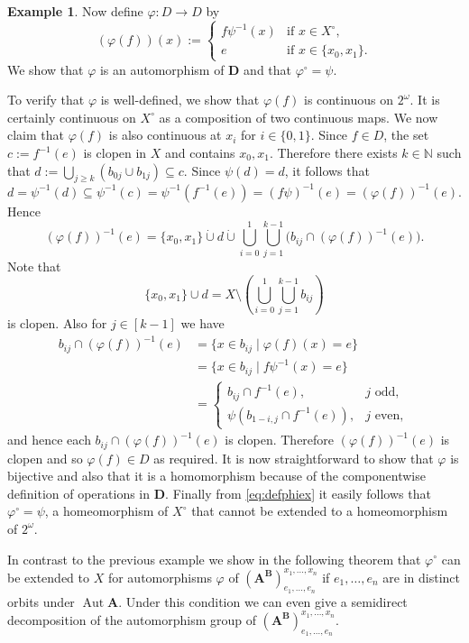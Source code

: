 \documentclass[12pt,a4paper,reqno]{amsart}
\numberwithin{equation}{section}
\theoremstyle{plain}
\theoremstyle{definition}
\newtheorem{exa}[thm]{Example}
\newcommand{\A}{\mathbf{A}}
\newcommand{\ABxe}{(\mathbf{A^B})^{x_1,\dots,x_n}_{e_1,\dots,e_n}}
\newcommand{\D}{\mathbf{D}}
\newcommand{\N}{\mathbb{N}}
\DeclareMathOperator{\Aut}{Aut}
\begin{document}
\begin{exa}
Now define $\varphi\colon D\rightarrow D$ by
\begin{equation}
\label{eq:defphiex}
(\varphi(f))(x):= \begin{cases} f\psi^{-1}(x)&\text{if } x\in X^\circ,\\
e&\text{if } x\in\{x_0,x_1\}.\end{cases}
\end{equation}
We show that $\varphi$ is an automorphism of $\D$ and that ${\varphi^\circ=\psi}$.

To verify that $\varphi$ is well-defined, we show that $\varphi(f)$ is continuous on $2^\omega$.
It is certainly continuous on $X^\circ$ as a composition of two continuous maps.
We now claim that $\varphi(f)$ is also continuous at $x_i$ for $i\in\{0,1\}$.
Since $f\in D$, the set $c:=f^{-1}(e)$ is clopen in $X$ and contains $x_0,x_1$.
Therefore there exists $k\in\N$ such that
$d:=\bigcup_{j\geq k} (b_{0j}\cup b_{1j}) \subseteq c$.
 Since $\psi(d)=d$, it follows that 
\[
d = \psi^{-1}(d) \subseteq \psi^{-1}(c) = \psi^{-1}(f^{-1}(e))
= (f \psi)^{-1}(e) = (\varphi(f))^{-1}(e).
\]
Hence 
\[
(\varphi(f))^{-1}(e)= \{ x_0,x_1\} \mathbin{\dot{\cup}} d\mathbin{\dot{\cup}} \bigcup_{i=0}^1\bigcup_{j=1}^{k-1} 
\bigl(b_{ij} \cap (\varphi(f))^{-1}(e)\bigr).
\]
Note that 
\[
\{ x_0,x_1\} \cup d= X\setminus (\bigcup_{i=0}^1\bigcup_{j=1}^{k-1} 
b_{ij})
\] 
is clopen.
Also for $j\in [k-1]$ we have
\begin{align*}
b_{ij} \cap (\varphi(f))^{-1}(e)
&= \{x \in b_{ij} \mid \varphi(f)(x) = e\} \\ & = \{x \in b_{ij} \mid f\psi^{-1}(x) = e\} \\
&=
\begin{cases}
b_{ij} \cap f^{-1}(e), & j \text{ odd}, \\
\psi(b_{1-i,j} \cap f^{-1}(e)), & j \text{ even},
\end{cases}
\end{align*}
and hence each $b_{ij} \cap (\varphi(f))^{-1}(e)$ is clopen.
Therefore $(\varphi(f))^{-1}(e)$ is clopen and so $\varphi(f)\in D$ as required.
It is now straightforward to show that $\varphi$ is bijective and also that it is a homomorphism because of the
componentwise definition of operations in $\D$. Finally from \eqref{eq:defphiex} it easily follows that
$\varphi^\circ=\psi$, a homeomorphism of $X^\circ$
that cannot be extended to a homeomorphism of $2^\omega$.
\end{exa}


 In contrast to the previous example we show in the following theorem that $\varphi^\circ$ can be extended to $X$
 for automorphisms $\varphi$ of $\ABxe$ if $e_1,\dots,e_n$ are in distinct orbits under $\Aut\A$.
 Under this condition we can even give a semidirect decomposition of the automorphism group of $\ABxe$.
 
\end{document}
